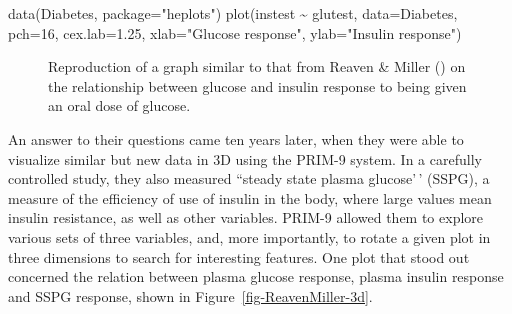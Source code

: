 \documentclass[
  letterpaper,
  10pt,
  krantz2]{krantz}
\makeatletter
\newenvironment{Shaded}{\begin{snugshade}}{\end{snugshade}}
\newcommand{\AttributeTok}[1]{\textcolor[rgb]{0.40,0.45,0.13}{#1}}
\newcommand{\DecValTok}[1]{\textcolor[rgb]{0.68,0.00,0.00}{#1}}
\newcommand{\FloatTok}[1]{\textcolor[rgb]{0.68,0.00,0.00}{#1}}
\newcommand{\FunctionTok}[1]{\textcolor[rgb]{0.28,0.35,0.67}{#1}}
\newcommand{\NormalTok}[1]{\textcolor[rgb]{0.00,0.23,0.31}{#1}}
\newcommand{\SpecialCharTok}[1]{\textcolor[rgb]{0.37,0.37,0.37}{#1}}
\newcommand{\StringTok}[1]{\textcolor[rgb]{0.13,0.47,0.30}{#1}}
\newenvironment{kframe}{%
  \medskip{}
  \setlength{\fboxsep}{.8em}
  \def\at@end@of@kframe{}%
  \ifinner\ifhmode%
  \def\at@end@of@kframe{\end{minipage}}%
  \begin{minipage}{\columnwidth}%
  \fi\fi%
  \def\FrameCommand##1{\hskip\@totalleftmargin \hskip-\fboxsep
  \colorbox{shadecolor}{##1}\hskip-\fboxsep
      \hskip-\linewidth \hskip-\@totalleftmargin \hskip\columnwidth}%
  \MakeFramed {\advance\hsize-\width
    \@totalleftmargin\z@ \linewidth\hsize
    \@setminipage}}%
{\par\unskip\endMakeFramed%
  \at@end@of@kframe}
\renewenvironment{Shaded}{\begin{kframe}}{\end{kframe}}
\makeatother
\begin{document}
\begin{Shaded}
\begin{Highlighting}[]
\FunctionTok{data}\NormalTok{(Diabetes, }\AttributeTok{package=}\StringTok{"heplots"}\NormalTok{)}
\FunctionTok{plot}\NormalTok{(instest }\SpecialCharTok{\textasciitilde{}}\NormalTok{ glutest, }\AttributeTok{data=}\NormalTok{Diabetes, }
     \AttributeTok{pch=}\DecValTok{16}\NormalTok{,}
     \AttributeTok{cex.lab=}\FloatTok{1.25}\NormalTok{,}
     \AttributeTok{xlab=}\StringTok{"Glucose response"}\NormalTok{,}
     \AttributeTok{ylab=}\StringTok{"Insulin response"}\NormalTok{)}
\end{Highlighting}
\end{Shaded}

\begin{figure}


\caption{\label{fig-diabetes1}Reproduction of a graph similar to that
from Reaven \& Miller () on the
relationship between glucose and insulin response to being given an oral
dose of glucose.}

\end{figure}%

An answer to their questions came ten years later, when they were able
to visualize similar but new data in 3D using the PRIM-9 system. In a
carefully controlled study, they also measured ``steady state plasma
glucose'\,' (SSPG), a measure of the efficiency of use of insulin in the
body, where large values mean insulin resistance, as well as other
variables. PRIM-9 allowed them to explore various sets of three
variables, and, more importantly, to rotate a given plot in three
dimensions to search for interesting features. One plot that stood out
concerned the relation between plasma glucose response, plasma insulin
response and SSPG response, shown in Figure~\ref{fig-ReavenMiller-3d}.
\end{document}
